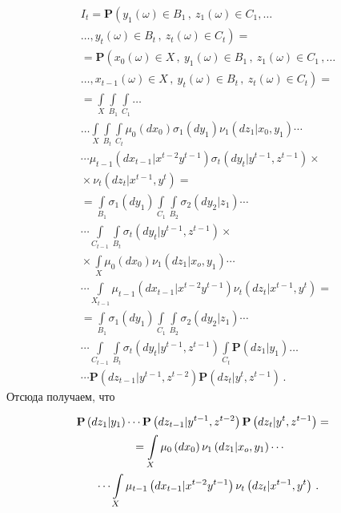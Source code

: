 \begin{multicols}{2}
\noindent
\begin{multline*}
I_t=\mathbf{P}\left( y_1(\omega)\in B_1\,,\ z_1(\omega)\in C_1, \ldots{}\right.\\[1pt]
\left.{}\ldots , y_t(\omega)\in B_t\,,\ 
z_t(\omega) \in C_t\right)={}\\[1pt]
{}=
\mathbf{P}\left( x_0(\omega)\in X\,,\ y_1(\omega)\in B_1\,,\ z_1(\omega)\in C_1\,, \ldots\right.\\[1pt]
\left.{}\ldots , x_{t-
1}(\omega)\in X\,,\ y_t(\omega)\in B_t\,,\ z_t(\omega)\in C_t\right)={}\\[1pt]
{}=
\int\limits_X \int\limits_{B_1} \int\limits_{C_1}\ldots \\[1pt]
\ldots\int\limits_X \int\limits_{B_t} 
\int\limits_{C_t} \mu_0\left( dx_0\right) \sigma_1\left( dy_1\right) \nu_1\left( dz_1\vert 
x_0,y_1\right)\cdots{}\\[1pt]
\cdots \mu_{t-1}\left( dx_{t-1}\vert x^{t-2} y^{t-1}\right) \sigma_t \left( dy_t\vert y^{t-
1},z^{t-1}\right)\times{}\\[1pt]
{}\times \nu_t\left( dz_t\vert x^{t-1},y^t\right)={}\\[1pt]
{}=\int\limits_{B_1} \sigma_1\left( dy_1\right) \int\limits_{C_1} \int\limits_{B_2} 
\sigma_2\left( dy_2\vert z_1\right)\cdots\\[1pt]
\cdots \int\limits_{C_{t-1}}\int\limits_{B_t} \sigma_t \left( 
dy_t\vert y^{t-1},z^{t-1}\right)\times{}\\[1pt]
{}\times \int\limits_X \mu_0\left(dx_0\right) \nu_1\left( dz_1\vert 
x_o,y_1\right)\cdots{}\\[1pt]
{}\cdots \int\limits_{X_{t-1}}\mu_{t-1}\left( dx_{t-1}\vert x^{t-2} y^{t-1}\right) \nu_t \left( 
dz_t\vert x^{t-1}, y^t\right)={}\\[1pt]
{}=\int\limits_{B_1} \sigma_1\left( dy_1\right) \int\limits_{C_1} 
\int\limits_{B_2}\sigma_2\left( dy_2\vert z_1\right)\cdots\\[1pt]
\cdots \int\limits_{C_{t-1}} 
\int\limits_{B_t} \sigma_t\left( dy_t\vert y^{t-1},z^{t-1}\right) \int\limits_{C_t} 
\mathbf{P}\left( dz_1\vert y_1\right)\ldots{}\\[1pt]
{}\cdots \mathbf{P}\left( dz_{t-1}\vert y^{t-1},z^{t-2}\right) \mathbf{P}\left( dz_t\vert y^t, 
z^{t-1}\right)\,.
\end{multline*}
Отсюда получаем, что

\noindent
  \begin{multline*}
\hspace*{-6.95218pt}\mathbf{P}\left( dz_1\vert y_1\right)\cdots \mathbf{P}\left( dz_{t-1}\vert y^{t-1},z^{t-
2}\right) \mathbf{P}\left( dz_t\vert y^t,z^{t-1}\right)={}\\[1pt]
  {}=\int\limits_X \mu_0\left( dx_0\right) \nu_1\left( dz_1\vert x_o,y_1\right)\cdots \\[1pt]
  \cdots
\int\limits_X \mu_{t-1}\left( dx_{t-1}\vert x^{t-2}y^{t-1}\right) \nu_t\left( dz_t\vert x^{t-
1},y^t\right)\,.
  \end{multline*}
  

\end{multicols}
